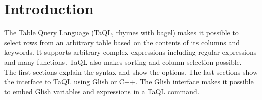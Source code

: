 

\section{Introduction}
The Table Query Language (TaQL, rhymes with bagel) makes
it possible to select
rows from an arbitrary table based on the contents of its
columns and keywords. It supports arbitrary complex
expressions including regular expressions and many functions.
TaQL also makes sorting and column selection possible.
\\
The first sections explain the syntax and show the options.
The last sections show the interface to TaQL using Glish or C++.
The Glish interface makes it possible to embed Glish
variables and expressions in a TaQL command.

